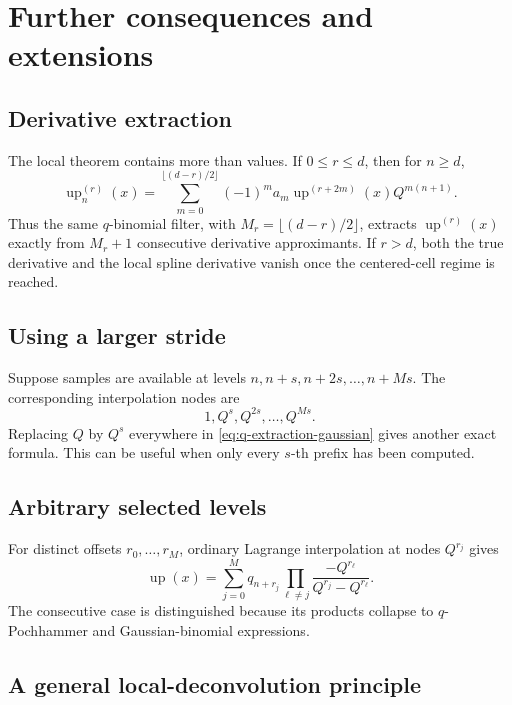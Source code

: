 \documentclass[11pt]{article}
\newcommand{\upf}{\operatorname{up}}
\begin{document}
\section{Further consequences and extensions}

\subsection{Derivative extraction}

The local theorem contains more than values.  If \(0\le r\le d\), then for
\(n\ge d\),
\begin{equation}\label{eq:derivative-geometric}
 \upf_n^{(r)}(x)=
 \sum_{m=0}^{\lfloor(d-r)/2\rfloor}
 (-1)^ma_m\upf^{(r+2m)}(x)Q^{m(n+1)}.
\end{equation}
Thus the same \(q\)-binomial filter, with
\(M_r=\lfloor(d-r)/2\rfloor\), extracts \(\upf^{(r)}(x)\) exactly from
\(M_r+1\) consecutive derivative approximants.  If \(r>d\), both the true
derivative and the local spline derivative vanish once the centered-cell
regime is reached.

\subsection{Using a larger stride}

Suppose samples are available at levels
\(n,n+s,n+2s,\ldots,n+Ms\).  The corresponding interpolation nodes are
\[
 1,Q^s,Q^{2s},\ldots,Q^{Ms}.
\]
Replacing \(Q\) by \(Q^s\) everywhere in
\cref{eq:q-extraction-gaussian} gives another exact formula.  This can be useful
when only every \(s\)-th prefix has been computed.

\subsection{Arbitrary selected levels}

For distinct offsets \(r_0,\ldots,r_M\), ordinary Lagrange interpolation at
nodes \(Q^{r_j}\) gives
\begin{equation}\label{eq:arbitrary-levels}
 \upf(x)=\sum_{j=0}^{M}q_{n+r_j}
 \prod_{\ell\ne j}\frac{-Q^{r_\ell}}{Q^{r_j}-Q^{r_\ell}}.
\end{equation}
The consecutive case is distinguished because its products collapse to
\(q\)-Pochhammer and Gaussian-binomial expressions.

\subsection{A general local-deconvolution principle}
\end{document}

